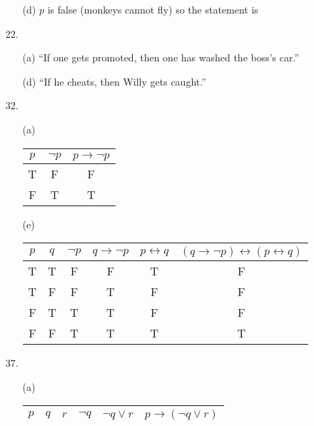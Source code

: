 \documentclass{article}
\begin{document}
\begin{enumerate}
\begin{itemize}
        \item[(d)] $p$ is false (monkeys cannot fly) so the statement is 
    \end{itemize}
    \item[22.]
    \begin{itemize}
        \item[(a)] ``If one gets promoted, then one has washed the boss's car.''
        \item[(d)] ``If he cheats, then Willy gets caught.''
    \end{itemize}
    \item[32.]
    \begin{itemize}
        \item[(a)]\hfill
        \vspace{-0.1in}
        \newline
        \begin{tabular}{|c|c|c|}\hline
        $p$ & $\neg p$ & $p \rightarrow \neg p$ \\\hline
        T & F & F \\%
        F & T & T \\\hline
        \end{tabular}
        \item[(e)]\hfill
        \vspace{-0.1in}
        \newline
        \begin{tabular}{|c|c|c|c|c|c|}\hline
        $p$ & $q$ & $\neg p$ & $q \rightarrow \neg p$ & $p \leftrightarrow q$ & $(q \rightarrow \neg p) \leftrightarrow (p \leftrightarrow q)$\\\hline
        T & T & F & F & T & F \\%
        T & F & F & T & F & F \\%
        F & T & T & T & F & F \\%
        F & F & T & T & T & T \\\hline
        \end{tabular}
    \end{itemize}
    \item[37.]
    \begin{itemize}
        \item[(a)]\hfill
        \vspace{-0.1in}
        \newline
        \begin{tabular}{|c|c|c|c|c|c|}\hline
        $p$ & $q$ & $r$ & $\neg q$ & $\neg q \lor r$ & $p \rightarrow (\neg q \lor r)$\\\hline

\end{tabular}
\end{itemize}
\end{enumerate}
\end{document}
